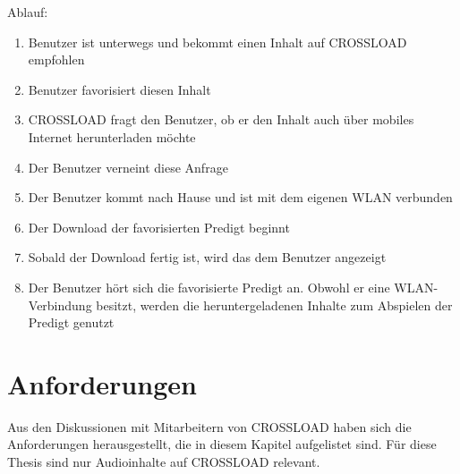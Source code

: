 Ablauf:
\begin{enumerate}
	\item Benutzer ist unterwegs und bekommt einen Inhalt auf CROSSLOAD empfohlen
	\item Benutzer favorisiert diesen Inhalt
	\item CROSSLOAD fragt den Benutzer, ob er den Inhalt auch über mobiles Internet herunterladen möchte
	\item Der Benutzer verneint diese Anfrage
	\item Der Benutzer kommt nach Hause und ist mit dem eigenen WLAN verbunden
	\item Der Download der favorisierten Predigt beginnt
	\item Sobald der Download fertig ist, wird das dem Benutzer angezeigt
	\item Der Benutzer hört sich die favorisierte Predigt an. Obwohl er eine WLAN-Verbindung besitzt, werden die heruntergeladenen Inhalte zum Abspielen der Predigt genutzt
\end{enumerate}

\section{Anforderungen}
Aus den Diskussionen mit Mitarbeitern von CROSSLOAD haben sich die Anforderungen herausgestellt, die in diesem Kapitel aufgelistet sind. Für diese Thesis sind nur Audioinhalte auf CROSSLOAD relevant.

